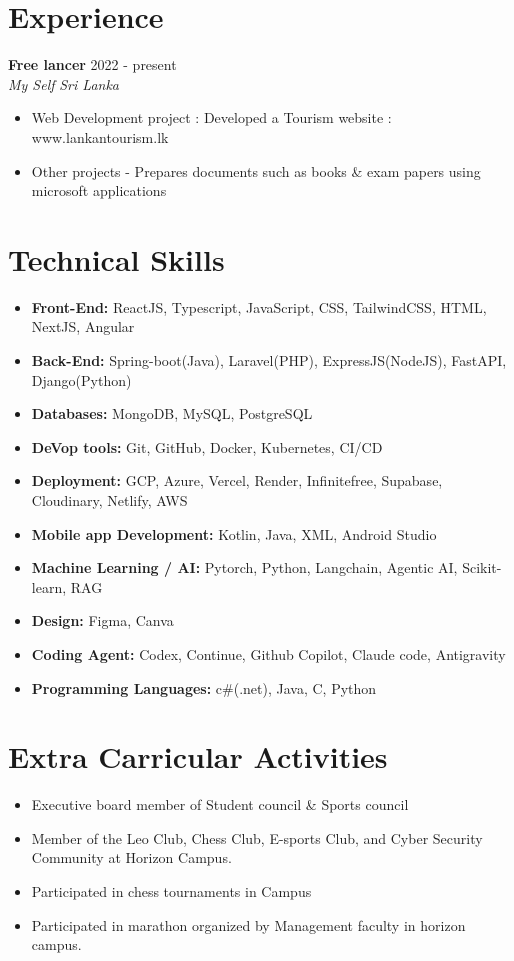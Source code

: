\documentclass[10pt,a4paper]{article}
\newcommand{\cventry}[4]{%
  \textbf{#1} \hfill #2\\
  \textit{#3} \hfill \textit{#4}\vspace{1pt}}
\begin{document}
\section{Experience}
\cventry{Free lancer}{2022 - present}{My Self}{Sri Lanka}
\begin{itemize}
  \item Web Development project : Developed a Tourism website : www.lankantourism.lk
  \item Other projects - Prepares documents such as books \& exam papers using microsoft applications
\end{itemize}

\section{Technical Skills}
\begin{itemize}[leftmargin=2pt, label={}, itemsep=2pt]
  \item \textbf{Front-End:} ReactJS, Typescript, JavaScript, CSS, TailwindCSS, HTML, NextJS, Angular
  \item \textbf{Back-End:} Spring-boot(Java), Laravel(PHP), ExpressJS(NodeJS), FastAPI, Django(Python)
  \item \textbf{Databases:} MongoDB, MySQL, PostgreSQL
  \item \textbf{DeVop tools:} Git, GitHub, Docker, Kubernetes, CI/CD
  \item \textbf{Deployment:} GCP, Azure, Vercel, Render, Infinitefree, Supabase, Cloudinary, Netlify, AWS
  \item \textbf{Mobile app Development:} Kotlin, Java, XML, Android Studio
  \item \textbf{Machine Learning / AI:} Pytorch, Python, Langchain, Agentic AI, Scikit-learn, RAG
  \item \textbf{Design: }Figma, Canva
  \item \textbf{Coding Agent: } Codex, Continue, Github Copilot, Claude code, Antigravity
  \item \textbf{Programming Languages:} c\#(.net), Java, C, Python
\end{itemize}

\section{Extra Carricular Activities}
\begin{itemize}
  \item Executive board member of Student council \& Sports council
  \item Member of the Leo Club, Chess Club, E-sports Club, and Cyber Security Community at Horizon Campus.
  \item Participated in chess tournaments in Campus
  \item Participated in marathon organized by Management faculty in horizon campus.
\end{itemize}
\end{document}
